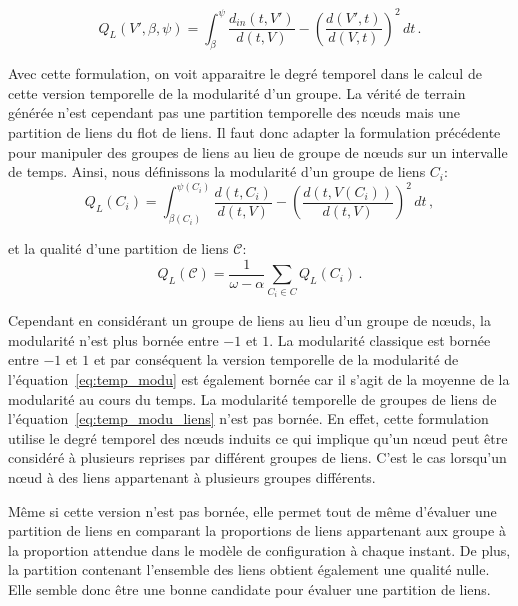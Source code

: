 \begin{equation}
Q_L(V', \beta, \psi)  = \int_{\beta}^{\psi} \! \dfrac{d_{in}(t,V')}{d(t,V)} - \left( \dfrac{d(V',t)}{d(V,t)} \right)^2  \, dt\, .
\end{equation}

Avec cette formulation, on voit apparaitre le degré temporel dans le calcul de cette version temporelle de la modularité d'un groupe.
La vérité de terrain générée n'est cependant pas une partition temporelle des n\oe uds mais une partition de liens du flot de liens.
Il faut donc adapter la formulation précédente pour manipuler des groupes de liens au lieu de groupe de n\oe uds sur un intervalle de temps.
Ainsi, nous définissons la modularité d'un groupe de liens $C_i$:
\begin{equation}
Q_L(C_i)  = \int_{\beta(C_i)}^{\psi(C_i)} \! \dfrac{d(t,C_i)}{d(t,V)} -  \left( \dfrac{d(t,V(C_i))}{d(t,V)} \right)^2 \, dt \,,
\label{}
\end{equation}

et la qualité d'une partition de liens $\mathcal{C}$:
\begin{equation}
Q_L(\mathcal{C}) = \dfrac{1}{\omega-\alpha} \sum_{C_i \in C} Q_L(C_i)\, .
\label{eq:temp_modu_liens}
\end{equation}

Cependant en considérant un groupe de liens au lieu d'un groupe de n\oe uds, la modularité n'est plus bornée entre $-1$ et $1$.
La modularité classique est bornée entre $-1$ et $1$ et par conséquent la version temporelle de la modularité de l'équation~\ref{eq:temp_modu} est également bornée car il s'agit de la moyenne de la modularité au cours du temps.
La modularité temporelle de groupes de liens de l'équation~\ref{eq:temp_modu_liens} n'est pas bornée.
En effet, cette formulation utilise le degré temporel des n\oe uds induits ce qui implique qu'un n\oe ud peut être considéré à plusieurs reprises par différent groupes de liens.
C'est le cas lorsqu'un n\oe ud à des liens appartenant à plusieurs groupes différents.

 

Même si cette version n'est pas bornée, elle permet tout de même d'évaluer une partition de liens en comparant la proportions de liens appartenant aux groupe à la proportion attendue dans le modèle de configuration à chaque instant.
De plus, la partition contenant l'ensemble des liens obtient également une qualité nulle.
Elle semble donc être une bonne candidate pour évaluer une partition de liens.

